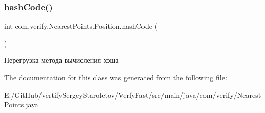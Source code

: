 \subsubsection{\texorpdfstring{hash\+Code()}{hashCode()}}
{\footnotesize\ttfamily int com.\+verify.\+Nearest\+Points.\+Position.\+hash\+Code (\begin{DoxyParamCaption}{ }\end{DoxyParamCaption})}

Перегрузка метода вычисления хэша 

The documentation for this class was generated from the following file\+:\begin{DoxyCompactItemize}
\item 
E\+:/\+Git\+Hub/vertify\+Sergey\+Staroletov/\+Verfy\+Fast/src/main/java/com/verify/Nearest\+Points.\+java\end{DoxyCompactItemize}
